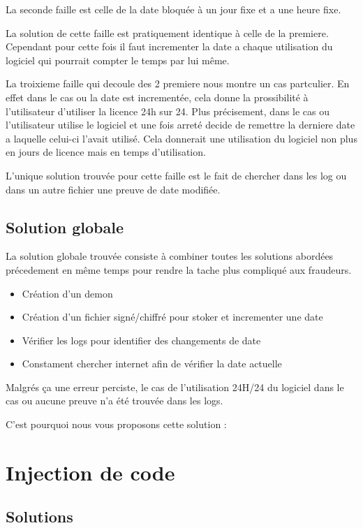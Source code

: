 	La seconde faille est celle de la date bloquée à un jour fixe et a une heure fixe. \newline

  La solution de cette faille est pratiquement identique à celle de la premiere. Cependant pour cette fois il faut incrementer la date
  a chaque utilisation du logiciel qui pourrait compter le temps par lui même. \newline

  La troixieme faille qui decoule des 2 premiere nous montre un cas partculier. En effet dans le cas ou la date est incrementée, cela donne la prossibilité à l'utilisateur
	d'utiliser la licence 24h sur 24. Plus précisement, dans le cas ou l'utilisateur utilise le logiciel et une fois arreté decide de remettre la derniere date a laquelle 
	celui-ci l'avait utilisé. Cela donnerait une utilisation du logiciel  non plus en jours de licence mais en temps d'utilisation.\newline

	L'unique solution trouvée pour cette faille est le fait de chercher dans les log ou dans un autre fichier une preuve de date modifiée.\newline

\section{Solution globale}

La solution globale trouvée consiste à combiner toutes les solutions abordées précedement en même temps pour rendre la tache plus compliqué aux fraudeurs.\newline

\begin{itemize}
	\item Création d'un demon
	\item Création d'un fichier signé/chiffré pour stoker et incrementer une date  
	\item Vérifier les logs pour identifier des changements de date
	\item Constament chercher internet afin de vérifier la date actuelle\newline
\end{itemize}

Malgrés ça une erreur perciste, le cas de l'utilisation 24H/24 du logiciel dans le cas ou aucune preuve n'a été trouvée dans les logs.

C'est pourquoi nous vous proposons cette solution :

\chapter{Injection de code}

\section{Solutions}

\label{chapter:bilan}

